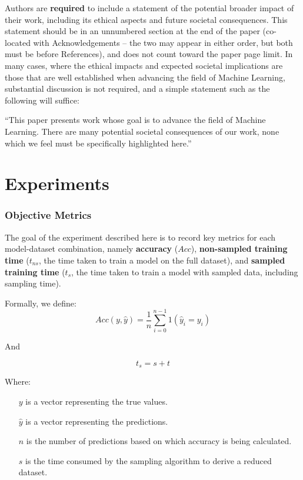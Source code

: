 \documentclass{article}
\theoremstyle{plain}
\theoremstyle{definition}
\theoremstyle{remark}
\begin{document}
Authors are \textbf{required} to include a statement of the potential 
broader impact of their work, including its ethical aspects and future 
societal consequences. This statement should be in an unnumbered 
section at the end of the paper (co-located with Acknowledgements -- 
the two may appear in either order, but both must be before References), 
and does not count toward the paper page limit. In many cases, where 
the ethical impacts and expected societal implications are those that 
are well established when advancing the field of Machine Learning, 
substantial discussion is not required, and a simple statement such 
as the following will suffice:

``This paper presents work whose goal is to advance the field of 
Machine Learning. There are many potential societal consequences 
of our work, none which we feel must be specifically highlighted here.''






\newpage
\appendix
\onecolumn
\section{Experiments}

\subsubsection{Objective Metrics}

The goal of the experiment described here is to record key metrics for each model-dataset combination, namely \textbf{accuracy} ($Acc$), \textbf{non-sampled training time} ($t_{ns}$, the time taken to train a model on the full dataset), and \textbf{sampled training time} ($t_s$,  the time taken to train a model with sampled data, including sampling time).

Formally, we define:
$$
Acc(y, \hat{y}) = \frac{1}{n} \sum_{i=0}^{n-1} 1(\hat{y}_i = y_i)
$$

And

$$
t_s = s + t
$$

Where:

\begin{itemize}

\item[$y$] is a vector representing the true values.
\item[$\hat{y}$] is a vector representing the predictions.
\item[$n$] is the number of predictions based on which accuracy is being calculated.
\item[$s$] is the time consumed by the sampling algorithm to derive a reduced dataset.

\end{itemize}
\end{document}
